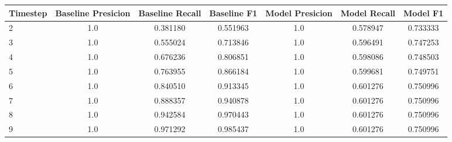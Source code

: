 \begin{tabular}{lcccccc}
\toprule
 Timestep &  Baseline Presicion &  Baseline Recall &  Baseline F1 &  Model Presicion &  Model Recall &  Model F1 \\
\midrule
        2 &                 1.0 &         0.381180 &     0.551963 &              1.0 &      0.578947 &  0.733333 \\
        3 &                 1.0 &         0.555024 &     0.713846 &              1.0 &      0.596491 &  0.747253 \\
        4 &                 1.0 &         0.676236 &     0.806851 &              1.0 &      0.598086 &  0.748503 \\
        5 &                 1.0 &         0.763955 &     0.866184 &              1.0 &      0.599681 &  0.749751 \\
        6 &                 1.0 &         0.840510 &     0.913345 &              1.0 &      0.601276 &  0.750996 \\
        7 &                 1.0 &         0.888357 &     0.940878 &              1.0 &      0.601276 &  0.750996 \\
        8 &                 1.0 &         0.942584 &     0.970443 &              1.0 &      0.601276 &  0.750996 \\
        9 &                 1.0 &         0.971292 &     0.985437 &              1.0 &      0.601276 &  0.750996 \\
\bottomrule
\end{tabular}
